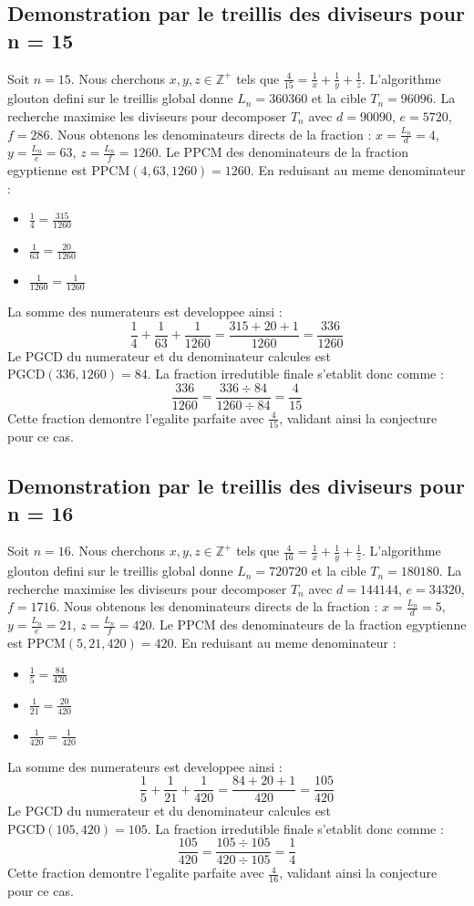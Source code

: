 \documentclass[11pt,a4paper]{article}
\begin{document}
\subsection{Demonstration par le treillis des diviseurs pour n = 15}
Soit $n = 15$. Nous cherchons $x, y, z \in \mathbb{Z}^{+}$ tels que $\frac{4}{15} = \frac{1}{x} + \frac{1}{y} + \frac{1}{z}$.
L'algorithme glouton defini sur le treillis global donne $L_n = 360360$ et la cible $T_n = 96096$.
La recherche maximise les diviseurs pour decomposer $T_n$ avec $d = 90090$, $e = 5720$, $f = 286$.
Nous obtenons les denominateurs directs de la fraction : $x = \frac{L_n}{d} = 4$, $y = \frac{L_n}{e} = 63$, $z = \frac{L_n}{f} = 1260$.
Le PPCM des denominateurs de la fraction egyptienne est $\text{PPCM}(4, 63, 1260) = 1260$.
En reduisant au meme denominateur :
\begin{itemize}
    \item $\frac{1}{4} = \frac{315}{1260}$
    \item $\frac{1}{63} = \frac{20}{1260}$
    \item $\frac{1}{1260} = \frac{1}{1260}$
\end{itemize}
La somme des numerateurs est developpee ainsi :
$$ \frac{1}{4} + \frac{1}{63} + \frac{1}{1260} = \frac{315 + 20 + 1}{1260} = \frac{336}{1260} $$
Le PGCD du numerateur et du denominateur calcules est $\text{PGCD}(336, 1260) = 84$.
La fraction irredutible finale s'etablit donc comme :
$$ \frac{336}{1260} = \frac{336 \div 84}{1260 \div 84} = \frac{4}{15} $$
Cette fraction demontre l'egalite parfaite avec $\frac{4}{15}$, validant ainsi la conjecture pour ce cas.

\subsection{Demonstration par le treillis des diviseurs pour n = 16}
Soit $n = 16$. Nous cherchons $x, y, z \in \mathbb{Z}^{+}$ tels que $\frac{4}{16} = \frac{1}{x} + \frac{1}{y} + \frac{1}{z}$.
L'algorithme glouton defini sur le treillis global donne $L_n = 720720$ et la cible $T_n = 180180$.
La recherche maximise les diviseurs pour decomposer $T_n$ avec $d = 144144$, $e = 34320$, $f = 1716$.
Nous obtenons les denominateurs directs de la fraction : $x = \frac{L_n}{d} = 5$, $y = \frac{L_n}{e} = 21$, $z = \frac{L_n}{f} = 420$.
Le PPCM des denominateurs de la fraction egyptienne est $\text{PPCM}(5, 21, 420) = 420$.
En reduisant au meme denominateur :
\begin{itemize}
    \item $\frac{1}{5} = \frac{84}{420}$
    \item $\frac{1}{21} = \frac{20}{420}$
    \item $\frac{1}{420} = \frac{1}{420}$
\end{itemize}
La somme des numerateurs est developpee ainsi :
$$ \frac{1}{5} + \frac{1}{21} + \frac{1}{420} = \frac{84 + 20 + 1}{420} = \frac{105}{420} $$
Le PGCD du numerateur et du denominateur calcules est $\text{PGCD}(105, 420) = 105$.
La fraction irredutible finale s'etablit donc comme :
$$ \frac{105}{420} = \frac{105 \div 105}{420 \div 105} = \frac{1}{4} $$
Cette fraction demontre l'egalite parfaite avec $\frac{4}{16}$, validant ainsi la conjecture pour ce cas.
\end{document}
